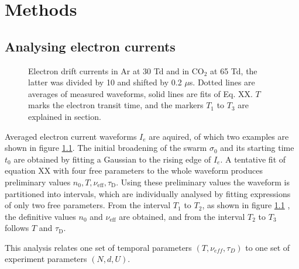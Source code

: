 \chapter{Methods}

\section{Analysing electron currents} \label{sec.analysecurrent}

\begin{figure}[htbp]
	\centering
	\caption[Kurze Abbildungsbeschreibung]{Electron drift currents in Ar at 30 Td and in CO$_2$ at 65 Td, the latter was divided by 10 and shifted by 0.2 $\mu$s. Dotted lines are averages of measured waveforms, solid lines are fits of Eq. XX. $T$ marks the electron transit time, and the markers $T_1$ to $T_3$ are explained in section.} %
	\label{fig.waveforms}
\end{figure}
Averaged electron current waveforms $I_e$ are aquired, of which two examples are shown in figure \ref{fig.waveforms}.
The initial broadening of the swarm $\sigma_0$ and its starting time $t_0$ are obtained by fitting a Gaussian to the rising edge of $I_e$. A tentative fit of equation XX with four free parameters to the whole waveform produces preliminary values $n_0, T, \nu_{\mathrm{eff}}, \tau_{\mathrm{D}}$. Using these preliminary values the waveform is partitioned into intervals, which are individually analysed by fitting expressions of only two free parameters. From the interval $T_1$ to $T_2$, as shown in figure \ref{fig.waveforms}
, the definitive values $n_0$ and $\nu_{\mathrm{eff}}$ are obtained, and from the interval $T_2$ to $T_3$ follows $T$ and $\tau{_\mathrm{D}}$.

This analysis relates one set of temporal parameters $(T, \nu_{eff}, \tau_{D})$ to one set of experiment parameters $(N, d, U)$.

